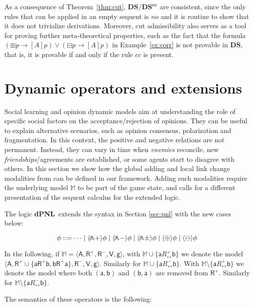 \documentclass{easychair}
\newcommand{\DS}{\mathbf{DS}}
\newcommand{\M}{\mathbb{M}}
\newcommand{\A}{\mathsf{A}}
\newcommand{\R}{\mathsf{R}}
\newcommand{\V}{\mathsf{V}}
\newcommand{\g}{\mathsf{g}}
\newcommand{\ag}{\mathsf{a}}
\renewcommand{\b}{\mathsf{b}}
\newcommand{\pnlP}{\langle \bigdoublewedge+ \rangle }
\newcommand{\pnlN}{\langle\bigdoublewedge-\rangle}
\newcommand{\pnlPN}{\langle\bigdoublewedge\pm\rangle}
\newcommand{\pnlOP}{\langle\oplus\rangle}
\newcommand{\pnlON}{\langle\ominus\rangle}
\newcommand{\bplus}{\boxplus}
\newcommand{\bminus}{\boxminus}
\DeclareMathOperator*{\bigdoublewedge}{\wedge\mkern-15mu\wedge}
\newcommand{\bbM}{\mathbb{M}}
\newcommand{\Rinv}{R_{\leftrightarrow}}
\newcommand{\cc}{\textbf{cc}}
\newcommand{\dPNL}{\textbf{dPNL}}
\begin{document}
As a consequence of Theorem~\ref{thm:cut}, $\DS/\DS^\cc$ are consistent, since the only rules that can be applied in an empty sequent is $no$ and it is routine to show that it does not trivialize derivations. Moreover, cut admissibility also serves as a tool for proving further meta-theoretical properties, such as the fact that the formula $(\bplus p \to [A]p) \vee (\bminus p \to [A]p)$ in Example~\ref{ex:corr} is not provable in $\DS$, that is, it is provable if and only if the rule $cc$ is present.

 

\section{Dynamic operators and extensions}
\label{sec:extensions}

Social learning and opinion dynamic models aim at understanding the role of
specific social factors on the acceptance/rejection of opinions. They can be
useful to explain alternative scenarios, such as opinion consensus,
polarization and fragmentation. In this context, the positive and negative
relations are not permanent. Instead, they can vary in time when
\emph{enemies} reconcile, new \emph{friendships}/agreements are established, or
some agents start to disagree with others. In this section we show how the
global adding and local link change  modalities from
\cite{DBLP:journals/logcom/PedersenSA21} can be defined in our framework.
Adding such modalities require the underlying model $\M$ to be part of the game
state, and calls for a different presentation of the sequent calculus for the
extended logic. 

The logic \dPNL~extends the syntax in Section \ref{sec:pnl} with the new cases below: 

\[
    \phi ::=\cdots \mid  \pnlP \phi\mid  \pnlN \phi\mid  \pnlPN \phi \mid  \pnlOP \phi \mid  \pnlON \phi
\]

In the following, if $\bbM = \langle \A,\R^+,\R^-,\V,\g\rangle$,
with $\bbM \cup \{\ag \Rinv^+ \b\}$ we denote the model 
$ \langle \A,\R^+ \cup \{\ag \R^+ \b, \b \R^+ \ag\},\R^-,\V,\g\rangle$.
Similarly for $\bbM \cup \{\ag \Rinv^- \b\}$. With 
$\bbM \setminus \{\ag \Rinv^{+} \b\}$ we denote the model where 
both $(\ag,\b)$ and $(\b,\ag)$ are removed from $\R^+$. Similarly 
for $\bbM \setminus \{\ag \Rinv^{-}\b\}$. 

The semantics of these operators is the following:\\
\end{document}

